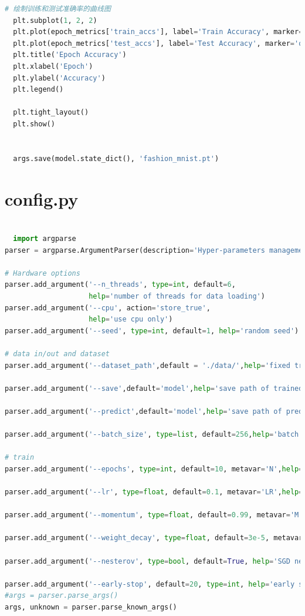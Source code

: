 \documentclass[12pt]{article}
\begin{document}
\begin{lstlisting}[language=Python]
  # 绘制训练和测试准确率的曲线图
  plt.subplot(1, 2, 2)
  plt.plot(epoch_metrics['train_accs'], label='Train Accuracy', marker='o')
  plt.plot(epoch_metrics['test_accs'], label='Test Accuracy', marker='o')
  plt.title('Epoch Accuracy')
  plt.xlabel('Epoch')
  plt.ylabel('Accuracy')
  plt.legend()
  
  plt.tight_layout()
  plt.show()
  
  
  args.save(model.state_dict(), 'fashion_mnist.pt')

\end{lstlisting}


\section{config.py}
\begin{lstlisting}[language=Python]

  import argparse
parser = argparse.ArgumentParser(description='Hyper-parameters management')

# Hardware options
parser.add_argument('--n_threads', type=int, default=6,
                    help='number of threads for data loading')
parser.add_argument('--cpu', action='store_true',
                    help='use cpu only')
parser.add_argument('--seed', type=int, default=1, help='random seed')

# data in/out and dataset
parser.add_argument('--dataset_path',default = './data/',help='fixed trainset root path')

parser.add_argument('--save',default='model',help='save path of trained model')

parser.add_argument('--predict',default='model',help='save path of predict model')

parser.add_argument('--batch_size', type=list, default=256,help='batch size of trainset')

# train
parser.add_argument('--epochs', type=int, default=10, metavar='N',help='number of epochs to train (default: 10)')

parser.add_argument('--lr', type=float, default=0.1, metavar='LR',help='learning rate (default: 0.01)')

parser.add_argument('--momentum', type=float, default=0.99, metavar='M',help='SGD momentum (default: 0.5)')

parser.add_argument('--weight_decay', type=float, default=3e-5, metavar='W',help='SGD weight_decay (default: 3e-5)')

parser.add_argument('--nesterov', type=bool, default=True, help='SGD nesterov (default: True)')

parser.add_argument('--early-stop', default=20, type=int, help='early stopping (default: 20)')
#args = parser.parse_args()
args, unknown = parser.parse_known_args()
  

\end{lstlisting}
\end{document}
